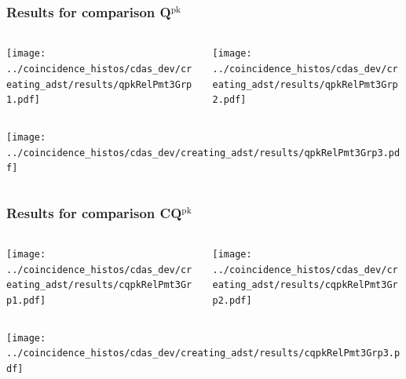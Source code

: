 \documentclass[aspectratio=169]{beamer}
\begin{document}
\begin{frame}
  \frametitle{Results for comparison Q$^{\mathrm{pk}}$}

  \begin{columns}
    \centering
    \begin{column}{0.5\textwidth}
      \texttt{[image: ../coincidence\_histos/cdas\_dev/creating\_adst/results/qpkRelPmt3Grp1.pdf]}
    \end{column}
    \begin{column}{0.5\textwidth}
      \texttt{[image: ../coincidence\_histos/cdas\_dev/creating\_adst/results/qpkRelPmt3Grp2.pdf]}
    \end{column}
  \end{columns}

  \begin{columns}
    \centering
    \begin{column}{0.5\textwidth}
      \texttt{[image: ../coincidence\_histos/cdas\_dev/creating\_adst/results/qpkRelPmt3Grp3.pdf]}
    \end{column}
  \end{columns}
\end{frame}

\begin{frame}
  \frametitle{Results for comparison CQ$^{\mathrm{pk}}$}

  \begin{columns}
    \centering
    \begin{column}{0.5\textwidth}
      \texttt{[image: ../coincidence\_histos/cdas\_dev/creating\_adst/results/cqpkRelPmt3Grp1.pdf]}
    \end{column}
    \begin{column}{0.5\textwidth}
      \texttt{[image: ../coincidence\_histos/cdas\_dev/creating\_adst/results/cqpkRelPmt3Grp2.pdf]}
    \end{column}
  \end{columns}

  \begin{columns}
    \centering
    \begin{column}{0.5\textwidth}
      \texttt{[image: ../coincidence\_histos/cdas\_dev/creating\_adst/results/cqpkRelPmt3Grp3.pdf]}
    \end{column}
  \end{columns}
\end{frame}
\end{document}

